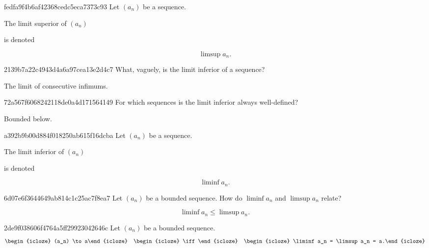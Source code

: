 \begin{note}{fedfa9f4b6af42368cedc5eca7373c93}
    Let \({ (a_n) }\) be a sequence.
    \begin{icloze}{2}The limit superior of \({ (a_n) }\)\end{icloze} is denoted
    \begin{icloze}{1}
        \[
            \limsup a_n.
        \]
    \end{icloze}
\end{note}

\begin{note}{2139b7a22c4943d4a6a97cea13e2d4c7}
    What, vaguely, is the limit inferior of a sequence?

    \begin{cloze}{1}
        The limit of consecutive infimums.
    \end{cloze}
\end{note}

\begin{note}{72a567f6068242118de0a4d171564149}
    For which sequences is the limit inferior always well-defined?

    \begin{cloze}{1}
        Bounded below.
    \end{cloze}
\end{note}

\begin{note}{a392b9b00d884f018250ab615f16dcba}
    Let \({ (a_n) }\) be a sequence.
    \begin{icloze}{2}The limit inferior of \({ (a_n) }\)\end{icloze} is denoted
    \begin{icloze}{1}
        \[
            \liminf a_n.
        \]
    \end{icloze}
\end{note}

\begin{note}{6d07e6f3644649ab814c1c25ac7f8ea7}
    Let \({ (a_n) }\) be a bounded sequence.
    How do \({ \liminf a_n }\) and \({ \limsup a_n }\) relate?

    \begin{cloze}{1}
        \[
            \liminf a_n \leq \limsup a_n.
        \]
    \end{cloze}
\end{note}

\begin{note}{2de9f038606f4764a5ff29923042646c}
    Let \({ (a_n) }\) be a bounded sequence.
    \[
        \begin{icloze}{2}(a_n) \to a\end{icloze}
        \quad \begin{icloze}{3}\iff\end{icloze} \quad
        \begin{icloze}{1}\liminf a_n = \limsup a_n = a.\end{icloze}
    \]
\end{note}

